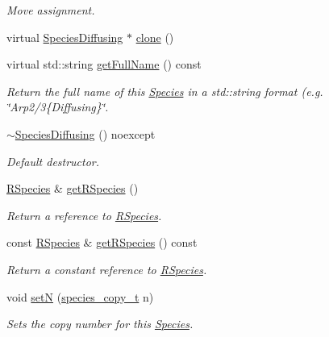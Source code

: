 \begin{DoxyCompactItemize}
\begin{DoxyCompactList}\small\item\em Move assignment. \end{DoxyCompactList}\item 
virtual \hyperlink{classchem_1_1SpeciesDiffusing}{Species\-Diffusing} $\ast$ \hyperlink{classchem_1_1SpeciesDiffusing_a69edbe33378230389a2fb99c4ca2b5ce}{clone} ()
\item 
virtual std\-::string \hyperlink{classchem_1_1SpeciesDiffusing_a03eba31a17a3713e8c45cc0952e922bb}{get\-Full\-Name} () const 
\begin{DoxyCompactList}\small\item\em Return the full name of this \hyperlink{classchem_1_1Species}{Species} in a std\-::string format (e.\-g. \char`\"{}\-Arp2/3\{\-Diffusing\}\char`\"{}. \end{DoxyCompactList}\item 
\hyperlink{classchem_1_1SpeciesDiffusing_a683ab39a97cef1b68be11c68b476a840}{$\sim$\-Species\-Diffusing} () noexcept
\begin{DoxyCompactList}\small\item\em Default destructor. \end{DoxyCompactList}\item 
\hyperlink{classchem_1_1RSpecies}{R\-Species} \& \hyperlink{classchem_1_1Species_a1719a8155a69e9a62593d23d4bfc8514}{get\-R\-Species} ()
\begin{DoxyCompactList}\small\item\em Return a reference to \hyperlink{classchem_1_1RSpecies}{R\-Species}. \end{DoxyCompactList}\item 
const \hyperlink{classchem_1_1RSpecies}{R\-Species} \& \hyperlink{classchem_1_1Species_a438dae186317809effdd040ed38c568b}{get\-R\-Species} () const 
\begin{DoxyCompactList}\small\item\em Return a constant reference to \hyperlink{classchem_1_1RSpecies}{R\-Species}. \end{DoxyCompactList}\item 
void \hyperlink{classchem_1_1Species_af10a33a212fdb986fb93613e9c219f7a}{set\-N} (\hyperlink{common_8h_a3503f321fd36304ee274141275cca586}{species\-\_\-copy\-\_\-t} n)
\begin{DoxyCompactList}\small\item\em Sets the copy number for this \hyperlink{classchem_1_1Species}{Species}. \end{DoxyCompactList}\item 

\end{DoxyCompactItemize}
